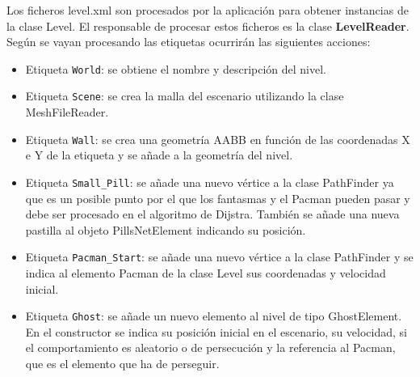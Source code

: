 Los ficheros level.xml son procesados por la aplicación para obtener instancias de la clase Level. El responsable de procesar estos ficheros es la clase \textbf{LevelReader}. Según se vayan procesando las etiquetas ocurrirán las siguientes acciones:
\begin{itemize}
\item Etiqueta \texttt{World}: se obtiene el nombre y descripción del nivel.
\item Etiqueta \texttt{Scene}: se crea la malla del escenario utilizando la clase MeshFileReader.
\item Etiqueta \texttt {Wall}: se crea una geometría AABB en función de las coordenadas X e Y de la etiqueta y se añade a la geometría del nivel.
\item Etiqueta \texttt{Small\_Pill}: se añade una nuevo vértice a la clase PathFinder ya que es un posible punto por el que los fantasmas y el Pacman pueden pasar y debe ser procesado en el algoritmo de Dijstra. También se añade una nueva pastilla al objeto PillsNetElement indicando su  posición.
\item Etiqueta \texttt{Pacman\_Start}: se añade una nuevo vértice a la clase PathFinder y se indica al elemento Pacman de la clase Level sus coordenadas y velocidad inicial.
\item Etiqueta \texttt{Ghost}: se añade un nuevo elemento al nivel de tipo GhostElement. En el constructor se indica su posición inicial en el escenario, su velocidad, si el comportamiento es aleatorio o de persecución y la referencia al Pacman, que es el elemento que ha de perseguir.
\end{itemize}

